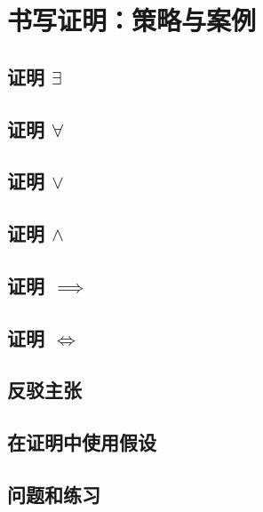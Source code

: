 \section{书写证明：策略与案例}

\subsection{证明 $\exists$}\label{sec:section4.9.1}

\subsection{证明 $\forall$}\label{sec:section4.9.2}

\subsection{证明 $\lor$}\label{sec:section4.9.3}

\subsection{证明 $\land$}\label{sec:section4.9.4}

\subsection{证明 $\implies$}\label{sec:section4.9.5}

\subsection{证明 $\iff$}\label{sec:section4.9.6}

\subsection{反驳主张}\label{sec:section4.9.7}

\subsection{在证明中使用假设}\label{sec:section4.9.8}

\subsection{问题和练习}\label{sec:section4.9.9}